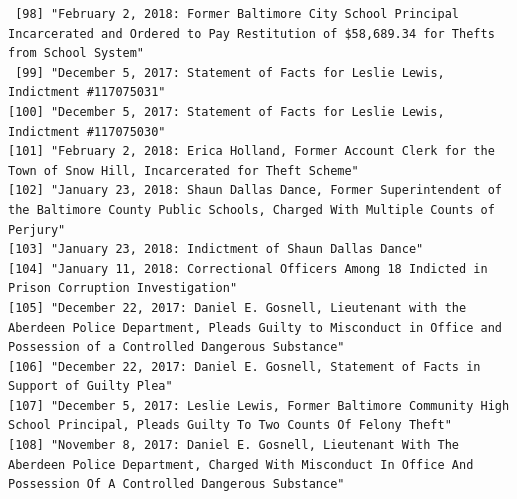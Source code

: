 \documentclass[
  letterpaper,
  DIV=11,
  numbers=noendperiod]{scrreprt}
\begin{document}
\begin{verbatim}
 [98] "February 2, 2018: Former Baltimore City School Principal Incarcerated and Ordered to Pay Restitution of $58,689.34 for Thefts from School System"                                                                                                    
 [99] "December 5, 2017: Statement of Facts for Leslie Lewis, Indictment #117075031"                                                                                                                                                                        
[100] "December 5, 2017: Statement of Facts for Leslie Lewis, Indictment #117075030"                                                                                                                                                                        
[101] "February 2, 2018: Erica Holland, Former Account Clerk for the Town of Snow Hill, Incarcerated for Theft Scheme"                                                                                                                                      
[102] "January 23, 2018: Shaun Dallas Dance, Former Superintendent of the Baltimore County Public Schools, Charged With Multiple Counts of Perjury"                                                                                                         
[103] "January 23, 2018: Indictment of Shaun Dallas Dance"                                                                                                                                                                                                  
[104] "January 11, 2018: Correctional Officers Among 18 Indicted in Prison Corruption Investigation"                                                                                                                                                        
[105] "December 22, 2017: Daniel E. Gosnell, Lieutenant with the Aberdeen Police Department, Pleads Guilty to Misconduct in Office and Possession of a Controlled Dangerous Substance"                                                                      
[106] "December 22, 2017: Daniel E. Gosnell, Statement of Facts in Support of Guilty Plea"                                                                                                                                                                  
[107] "December 5, 2017: Leslie Lewis, Former Baltimore Community High School Principal, Pleads Guilty To Two Counts Of Felony Theft"                                                                                                                       
[108] "November 8, 2017: Daniel E. Gosnell, Lieutenant With The Aberdeen Police Department, Charged With Misconduct In Office And Possession Of A Controlled Dangerous Substance"                                                                           

\end{verbatim}
\end{document}
